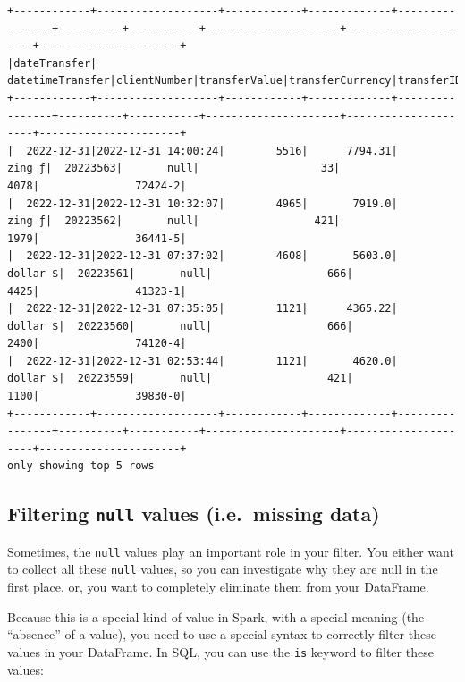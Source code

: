 \documentclass[
  11pt,
  letterpaper,
  DIV=11,
  numbers=noendperiod]{scrreprt}
\begin{document}
\begin{verbatim}
+------------+-------------------+------------+-------------+----------------+----------+-----------+---------------------+---------------------+----------------------+
|dateTransfer|   datetimeTransfer|clientNumber|transferValue|transferCurrency|transferID|transferLog|destinationBankNumber|destinationBankBranch|destinationBankAccount|
+------------+-------------------+------------+-------------+----------------+----------+-----------+---------------------+---------------------+----------------------+
|  2022-12-31|2022-12-31 14:00:24|        5516|      7794.31|          zing ƒ|  20223563|       null|                   33|                 4078|               72424-2|
|  2022-12-31|2022-12-31 10:32:07|        4965|       7919.0|          zing ƒ|  20223562|       null|                  421|                 1979|               36441-5|
|  2022-12-31|2022-12-31 07:37:02|        4608|       5603.0|        dollar $|  20223561|       null|                  666|                 4425|               41323-1|
|  2022-12-31|2022-12-31 07:35:05|        1121|      4365.22|        dollar $|  20223560|       null|                  666|                 2400|               74120-4|
|  2022-12-31|2022-12-31 02:53:44|        1121|       4620.0|        dollar $|  20223559|       null|                  421|                 1100|               39830-0|
+------------+-------------------+------------+-------------+----------------+----------+-----------+---------------------+---------------------+----------------------+
only showing top 5 rows
\end{verbatim}

\hypertarget{filtering-null-values-i.e.-missing-data}{%
\subsection{\texorpdfstring{Filtering \texttt{null} values (i.e.~missing
data)}{Filtering null values (i.e.~missing data)}}\label{filtering-null-values-i.e.-missing-data}}

Sometimes, the \texttt{null} values play an important role in your
filter. You either want to collect all these \texttt{null} values, so
you can investigate why they are null in the first place, or, you want
to completely eliminate them from your DataFrame.

Because this is a special kind of value in Spark, with a special meaning
(the ``absence'' of a value), you need to use a special syntax to
correctly filter these values in your DataFrame. In SQL, you can use the
\texttt{is} keyword to filter these values:
\end{document}
